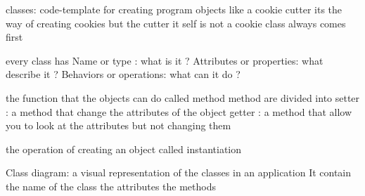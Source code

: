 
classes:
  code-template for creating program objects 
  like a cookie cutter  its the way of creating cookies but the cutter it self is not a cookie 
  class always comes first 

every class has 
  Name or type :
    what is it ?
  Attributes or properties:
    what describe it ?
  Behaviors or operations: 
    what can it do ?


the function that the objects can do called method 
   method are divided into 
    setter : a method that change the attributes of the object 
    getter : a method that allow you to look at the attributes but not changing them  

the operation of creating an object called instantiation

Class diagram: 
  a visual representation of the classes in an application
  It contain 
    the name of the class 
    the attributes 
    the methods